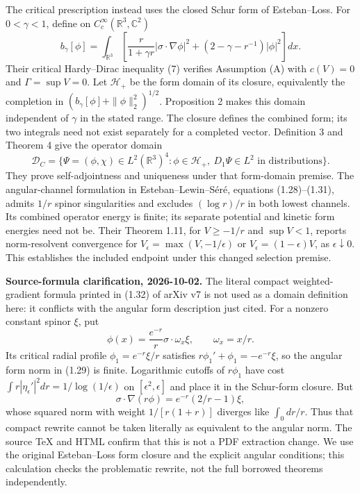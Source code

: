 \documentclass[11pt,a4paper]{article}
\begin{document}
The critical prescription instead uses the closed Schur form of
Esteban--Loss. For \(0<\gamma<1\), define on
\(C_c^\infty(\mathbb R^3,\mathbb C^2)\)
\[b_\gamma[\phi]=\int_{\mathbb R^3}\left[
\frac{r}{1+\gamma r}|\sigma\cdot\nabla\phi|^2
+(2-\gamma-r^{-1})|\phi|^2\right]dx.\] Their critical Hardy--Dirac
inequality (7) verifies Assumption (A) with \(c(V)=0\) and
\(\Gamma=\sup V=0\). Let \(\mathcal H_+\) be the form domain of its
closure, equivalently the completion in
\((b_\gamma[\phi]+\|\phi\|_2^2)^{1/2}\). Proposition 2 makes this domain
independent of \(\gamma\) in the stated range. The closure defines the
combined form; its two integrals need not exist separately for a
completed vector. Definition 3 and Theorem 4 give the operator domain
\[\mathcal D_C=\{\Psi=(\phi,\chi)\in L^2(\mathbb R^3)^4:
\phi\in\mathcal H_+,\ D_1\Psi\in L^2\text{ in distributions}\}.\] They
prove self-adjointness and uniqueness under that form-domain premise.
The angular-channel formulation in Esteban--Lewin--Séré, equations
(1.28)--(1.31), admits \(1/r\) spinor singularities and excludes
\((\log r)/r\) in both lowest channels. Its combined operator energy is
finite; its separate potential and kinetic form energies need not be.
Their Theorem 1.11, for \(V\ge-1/r\) and \(\sup V<1\), reports
norm-resolvent convergence for \(V_\epsilon=\max(V,-1/\epsilon)\) or
\(V_\epsilon=(1-\epsilon)V\), as \(\epsilon\downarrow0\). This
establishes the included endpoint under this changed selection premise.

\textbf{Source-formula clarification, 2026-10-02.} The literal compact
weighted-gradient formula printed in (1.32) of arXiv v7 is not used as a
domain definition here: it conflicts with the angular form description
just cited. For a nonzero constant spinor \(\xi\), put
\[\phi(x)=\frac{e^{-r}}r\sigma\cdot\omega_x\xi,
\qquad \omega_x=x/r.\] Its critical radial profile
\(\phi_1=e^{-r}\xi/r\) satisfies \(r\phi_1'+\phi_1=-e^{-r}\xi\), so the
angular form norm in (1.29) is finite. Logarithmic cutoffs of
\(r\phi_1\) have cost \(\int r|\eta_\epsilon'|^2dr=1/\log(1/\epsilon)\)
on \([\epsilon^2,\epsilon]\) and place it in the Schur-form closure. But
\[\sigma\cdot\nabla(r\phi)=e^{-r}(2/r-1)\xi,\] whose squared norm with
weight \(1/[r(1+r)]\) diverges like \(\int_0 dr/r\). Thus that compact
rewrite cannot be taken literally as equivalent to the angular norm. The
source TeX and HTML confirm that this is not a PDF extraction change. We
use the original Esteban--Loss form closure and the explicit angular
conditions; this calculation checks the problematic rewrite, not the
full borrowed theorems independently.
\end{document}
